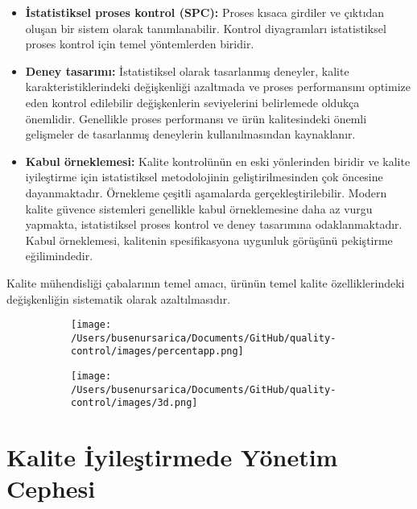 \documentclass[
]{book}
\providecommand{\tightlist}{%
  \setlength{\itemsep}{0pt}\setlength{\parskip}{0pt}}
\begin{document}
\begin{itemize}
\item
  \textbf{İstatistiksel proses kontrol (SPC):} Proses kısaca girdiler ve çıktıdan oluşan bir sistem olarak tanımlanabilir. Kontrol diyagramları istatistiksel proses kontrol için temel yöntemlerden biridir.
\item
  \textbf{Deney tasarımı:} İstatistiksel olarak tasarlanmış deneyler, kalite karakteristiklerindeki değişkenliği azaltmada ve proses performansını optimize eden kontrol edilebilir değişkenlerin seviyelerini belirlemede oldukça önemlidir. Genellikle proses performansı ve ürün kalitesindeki önemli gelişmeler de tasarlanmış deneylerin kullanılmasından kaynaklanır.
\end{itemize}

\begin{itemize}
\tightlist
\item
  \textbf{Kabul örneklemesi:} Kalite kontrolünün en eski yönlerinden biridir ve kalite iyileştirme için istatistiksel metodolojinin geliştirilmesinden çok öncesine dayanmaktadır. Örnekleme çeşitli aşamalarda gerçekleştirilebilir. Modern kalite güvence sistemleri genellikle kabul örneklemesine daha az vurgu yapmakta, istatistiksel proses kontrol ve deney tasarımına odaklanmaktadır. Kabul örneklemesi, kalitenin spesifikasyona uygunluk görüşünü pekiştirme eğilimindedir.
\end{itemize}

Kalite mühendisliği çabalarının temel amacı, ürünün temel kalite özelliklerindeki değişkenliğin sistematik olarak azaltılmasıdır.

\begin{figure}
\begin{subfigure}[h]{0.4\linewidth}
\texttt{[image: /Users/busenursarica/Documents/GitHub/quality-control/images/percentapp.png]}
\end{subfigure}
\hfill
\begin{subfigure}[h]{0.6\linewidth}
\texttt{[image: /Users/busenursarica/Documents/GitHub/quality-control/images/3d.png]}
\end{subfigure}%
\end{figure}




\hypertarget{kalite-iyileux15ftirmede-yuxf6netim-cephesi}{%
\section{Kalite İyileştirmede Yönetim Cephesi}\label{kalite-iyileux15ftirmede-yuxf6netim-cephesi}}
\end{document}
